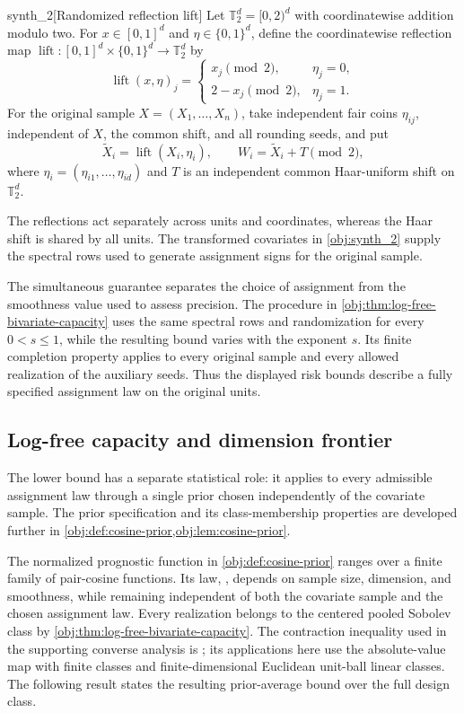 \documentclass[11pt]{article}
\begin{document}
\begin{definitionv}{synth_2}[Randomized reflection lift]
Let \(\mathbb T_2^d=[0,2)^d\) with coordinatewise addition modulo two. For \(x\in[0,1]^d\) and \(\eta\in\{0,1\}^d\), define the coordinatewise reflection map \(\operatorname{lift}:[0,1]^d\times\{0,1\}^d\to\mathbb T_2^d\) by
\[
\operatorname{lift}(x,\eta)_j
=
\begin{cases}
x_j \pmod 2,&\eta_j=0,\\
2-x_j \pmod 2,&\eta_j=1.
\end{cases}
\]
For the original sample \(X=(X_1,\ldots,X_n)\), take independent fair coins \(\eta_{ij}\), independent of \(X\), the common shift, and all rounding seeds, and put
\[
\widetilde X_i=\operatorname{lift}(X_i,\eta_i),
\qquad
W_i=\widetilde X_i+T\pmod2,
\]
where \(\eta_i=(\eta_{i1},\ldots,\eta_{id})\) and \(T\) is an independent common Haar-uniform shift on \(\mathbb T_2^d\).
\end{definitionv}

The reflections act separately across units and coordinates, whereas the Haar shift is shared by all units. The transformed covariates in \cref{obj:synth_2} supply the spectral rows used to generate assignment signs for the original sample.

The simultaneous guarantee separates the choice of assignment from the smoothness value used to assess precision. The procedure in \cref{obj:thm:log-free-bivariate-capacity} uses the same spectral rows and randomization for every \(0<s\leq1\), while the resulting bound varies with the exponent \(s\). Its finite completion property applies to every original sample and every allowed realization of the auxiliary seeds. Thus the displayed risk bounds describe a fully specified assignment law on the original units.

\subsection{Log-free capacity and dimension frontier}

The lower bound has a separate statistical role: it applies to every admissible assignment law through a single prior chosen independently of the covariate sample. The prior specification and its class-membership properties are developed further in \cref{obj:def:cosine-prior,obj:lem:cosine-prior}.

The normalized prognostic function  in \cref{obj:def:cosine-prior} ranges over a finite family of pair-cosine functions. Its law, , depends on sample size, dimension, and smoothness, while remaining independent of both the covariate sample and the chosen assignment law. Every realization belongs to the centered pooled Sobolev class by \cref{obj:thm:log-free-bivariate-capacity}. The contraction inequality used in the supporting converse analysis is \citet[Theorem~12(4), with Rademacher complexity as in Definition~2]{BartlettMendelson2002Complexities}; its applications here use the absolute-value map with finite classes and finite-dimensional Euclidean unit-ball linear classes. The following result states the resulting prior-average bound over the full design class.
\end{document}
